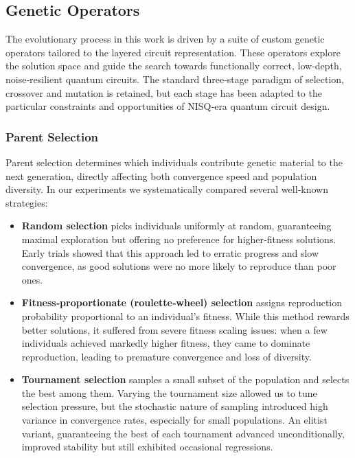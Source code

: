 \documentclass[11pt,a4paper]{article}
\begin{document}
\subsection{Genetic Operators}
The evolutionary process in this work is driven by a suite of custom genetic operators tailored to the layered circuit representation. These operators explore the solution space and guide the search towards functionally correct, low‐depth, noise‐resilient quantum circuits. The standard three‐stage paradigm of selection, crossover and mutation is retained, but each stage has been adapted to the particular constraints and opportunities of NISQ‐era quantum circuit design.

\subsubsection*{Parent Selection}
Parent selection determines which individuals contribute genetic material to the next generation, directly affecting both convergence speed and population diversity. In our experiments we systematically compared several well‐known strategies:

\begin{itemize}
    \item \textbf{Random selection} picks individuals uniformly at random, guaranteeing maximal exploration but offering no preference for higher‐fitness solutions. Early trials showed that this approach led to erratic progress and slow convergence, as good solutions were no more likely to reproduce than poor ones.
    \item \textbf{Fitness‐proportionate (roulette‐wheel) selection} assigns reproduction probability proportional to an individual’s fitness. While this method rewards better solutions, it suffered from severe fitness scaling issues: when a few individuals achieved markedly higher fitness, they came to dominate reproduction, leading to premature convergence and loss of diversity.
    \item \textbf{Tournament selection} samples a small subset of the population and selects the best among them. Varying the tournament size allowed us to tune selection pressure, but the stochastic nature of sampling introduced high variance in convergence rates, especially for small populations. An elitist variant, guaranteeing the best of each tournament advanced unconditionally, improved stability but still exhibited occasional regressions.
\end{itemize}
\end{document}
